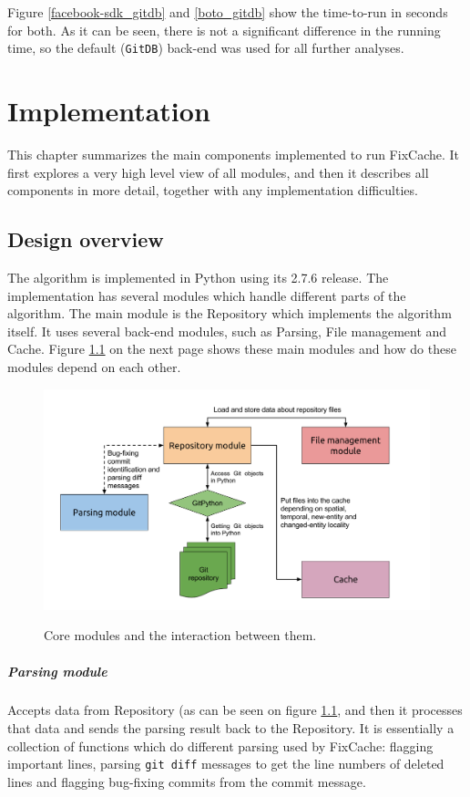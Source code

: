 \documentclass[12pt,twoside,notitlepage]{report}
\newcommand{\fxch}{FixCache}
\begin{document}
Figure \ref{facebook-sdk_gitdb} and \ref{boto_gitdb} show the time-to-run in seconds for both. As it can be seen, there is not a significant difference in the running time, so the default (\texttt{GitDB}) back-end was used for all further analyses.
\cleardoublepage
\chapter{Implementation}
This chapter summarizes the main components implemented to run \fxch{}. It first explores a very high level view of all modules, and then it describes all components in more detail, together with any implementation difficulties.
\section{Design overview}

The algorithm is implemented in Python using its 2.7.6 release. The implementation has several modules which handle different parts of the algorithm. The main module is the Repository which implements the algorithm itself. It uses several back-end modules, such as Parsing, File management and Cache. Figure \ref{fixcache_flowgraph} on the next page shows these main modules and how do these modules depend on each other.

\begin{figure}[h]
\includegraphics[width=1.0\textwidth]{fixcache_flowgraph.png}
\label{fixcache_flowgraph}
\caption{Core modules and the interaction between them.}
\end{figure} 

\paragraph{Parsing module}Accepts data from Repository (as can be seen on figure \ref{fixcache_flowgraph}, and then it processes that data and sends the parsing result back to the Repository. It is essentially a collection of functions which do different parsing used by \fxch{}: flagging important lines, parsing \texttt{git diff} messages to get the line numbers of deleted lines and flagging bug-fixing commits from the commit message.
\end{document}

